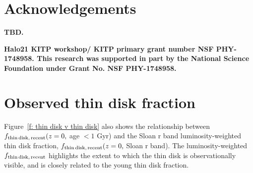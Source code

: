 \documentclass[fleqn,usenatbib]{mnras}
\begin{document}
\section*{Acknowledgements}

\textbf{TBD.}

\textbf{Halo21 KITP workshop/ KITP primary grant number NSF PHY-1748958.
This research was supported in part by the National Science Foundation under Grant No. NSF PHY-1748958.
}










\appendix

\section{Observed thin disk fraction}
\label{s: appendix-sloan thin disk fraction}
Figure~\ref{f: thin disk v thin disk} also shows the relationship between $f_{\rm thin\,disk,\,recent}(z=0,$ age $<1$ Gyr) and the Sloan r band luminosity-weighted thin disk fraction, $f_{\rm thin\,disk,\,recent}(z=0,$ Sloan r band).
The luminosity-weighted $f_{\rm thin\,disk,\,recent}$ highlights the extent to which the thin disk is observationally visible, and is closely related to the young thin disk fraction.
\end{document}
